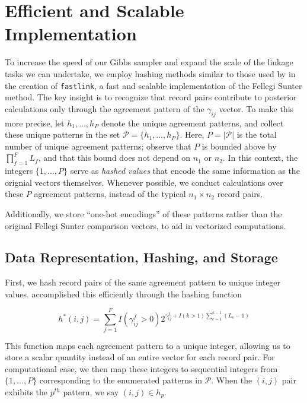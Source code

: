 \documentclass[12pt,letterpaper]{article}
\newcommand{\1}[1]{\mathbb{I}\!\left[#1\right]} %
\begin{document}
\section{Efficient and Scalable Implementation}
\label{sec:efficiency}

To increase the speed of our Gibbs sampler and expand the scale of the linkage tasks we can undertake, we employ hashing methods similar to those used by \cite{enamorado2019using} in the creation of \texttt{fastlink}, a fast and scalable implementation of the Fellegi Sunter method. The key insight is to recognize that record pairs contribute to posterior calculations only through the agreement pattern of the $\gamma_{ij}$ vector. To make this more precise, let $h_1, \ldots, h_P$ denote the unique agreement patterns, and collect these unique patterns in the set $\mathcal{P} = \{h_1, \ldots, h_P\}$. Here, 
$P = |\mathcal{P}|$ is the total number of unique agreement
patterns; observe that \(P\) is bounded above by \(\prod_{f=1}^F L_f\), and that this bound does not depend on \(n_1\) or \(n_2\). In this context, the integers $\{1, \ldots, P\}$ serve as \emph{hashed values} that encode the same information as the orignial vectors themselves. Whenever possible, we conduct calculations over these \(P\) agreement
patterns, instead of the typical \(n_1 \times n_2\) record pairs.

Additionally, we store ``one-hot encodings'' of these patterns rather than the original Fellegi Sunter comparison vectors, to aid in vectorized computations.  

\hypertarget{data-representation-hashing-and-storage}{%
	\subsection{Data Representation, Hashing, and
		Storage}\label{data-representation-hashing-and-storage}}

First, we hash record pairs of the same agreement pattern to unique integer values. \cite{enamorado2019using} accomplished this efficiently through the hashing function

$$h^{*}(i, j) = \sum_{f = 1}^F I(\gamma_{ij}^f > 0)2^{\gamma_{ij}^f + I(k>1)\sum_{e=1}^{k-1}(L_e -1)}$$

This function maps each agreement pattern to a unique integer, allowing us to store a scalar quantity instead of an entire vector for each record pair. For computational ease, we then map these integers to sequential integers from $\{1, \ldots, P\}$ corresponding to the enumerated patterns in $\mathcal{P}$. When the $(i, j)$ pair exhibits the $p^{th}$ pattern, we say $(i, j) \in h_p$.
\end{document}
